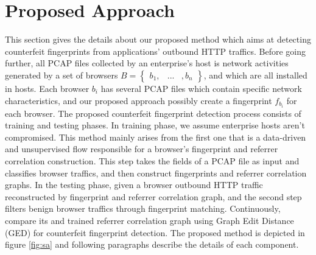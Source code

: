 \section{Proposed Approach}

This section gives the details about our proposed method which aims at detecting counterfeit fingerprints from applications' outbound HTTP traffics. Before going further, all PCAP files collected by an enterprise's host is network activities generated by a set of browsers $B = \begin{Bmatrix} b_{1}, & ... & , b_{n} \end{Bmatrix}$, and which are all installed in hosts. Each browser $b_{i}$ has several PCAP files which contain specific network characteristics, and our proposed approach possibly create a fingerprint $f_{b_{i}}$ for each browser. The proposed counterfeit fingerprint detection process consists of training and testing phases. In training phase, we assume enterprise hosts aren't compromised. This method mainly arises from the first one that is a data-driven and unsupervised flow responsible for a browser's fingerprint \cite{bortolameotti2017decanter} and referrer correlation construction. This step takes the fields of a PCAP file as input and classifies browser traffics, and then construct fingerprints and referrer correlation graphs. In the testing phase, given a browser outbound HTTP traffic reconstructed by fingerprint and referrer correlation graph, and the second step filters benign browser traffics through fingerprint matching. Continuously, compare its and trained referrer correlation graph using Graph Edit Distance (GED) for counterfeit fingerprint detection. The proposed method is depicted in figure \ref{fig:sa} and following paragraphs describe the details of each component.

